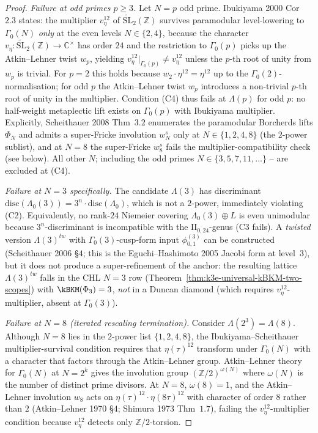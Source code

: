 \begin{proof}[Proof]
\emph{Failure at odd primes $p\ge 3$.} Let $N = p$ odd prime.
Ibukiyama 2000 Cor~$2.3$ states: the multiplier
$v_\eta^{12}$ of $\widetilde{\mathrm{SL}}_2(\mathbb{Z})$ survives
paramodular level-lowering to $\Gamma_0(N)$ \emph{only} at the
even levels $N\in\{2,4\}$, because the character
$v_\eta\colon\widetilde{\mathrm{SL}}_2(\mathbb{Z})\to\mathbb{C}^\times$
has order $24$ and the restriction to $\Gamma_0(p)$ picks up the
Atkin--Lehner twist $w_p$, yielding
$v_\eta^{12}|_{\Gamma_0(p)} \neq v_\eta^{12}$ unless
the $p$-th root of unity from $w_p$ is trivial. For $p=2$ this
holds because $w_2\cdot\eta^{12}=\eta^{12}$ up to the
$\Gamma_0(2)$-normalisation; for odd $p$ the Atkin--Lehner twist
$w_p$ introduces a non-trivial $p$-th root of unity in the
multiplier. Condition (C4) thus fails at $\Lambda(p)$ for odd $p$:
no half-weight metaplectic lift exists on $\Gamma_0(p)$ with
Ibukiyama multiplier. Explicitly, Scheithauer 2008 Thm~$3.2$
enumerates the paramodular Borcherds lifts $\Phi_N$ and admits a
super-Fricke involution $w_N^s$ only at $N\in\{1,2,4,8\}$
(the $2$-power sublist), and at $N=8$ the super-Fricke $w_8^s$
fails the multiplier-compatibility check (see below). All other
$N$; including the odd primes $N\in\{3,5,7,11,\ldots\}$ --
are excluded at (C4).

\emph{Failure at $N=3$ specifically.} The candidate
$\Lambda(3)$ has discriminant $\mathrm{disc}(\Lambda_0(3)) =
3^n\cdot\mathrm{disc}(\Lambda_0)$, which is not a $2$-power,
immediately violating (C2). Equivalently, no rank-$24$ Niemeier
covering $\Lambda_0(3)\oplus L$ is even unimodular because
$3^n$-discriminant is incompatible with the
$\mathrm{II}_{0,24}$-genus (C3 fails). A \emph{twisted} version
$\Lambda(3)^{tw}$ with $\Gamma_0(3)$-cusp-form input
$\phi_{0,1}^{(3)}$ can be constructed (Scheithauer 2006 \S$4$;
this is the Eguchi--Hashimoto 2005 Jacobi form at level~$3$), but
it does not produce a super-refinement of the anchor: the
resulting lattice $\Lambda(3)^{tw}$ falls in the CHL $N=3$ row
(Theorem~\ref{thm:k3e-universal-kBKM-two-scopes}) with
$\kBKM(\Phi_3) = 3$, \emph{not} in a Duncan diamond
(which requires $v_\eta^{12}$-multiplier, absent at $\Gamma_0(3)$).

\emph{Failure at $N=8$ (iterated rescaling termination).} Consider
$\Lambda(2^3) = \Lambda(8)$. Although $N=8$ lies in the
$2$-power list $\{1,2,4,8\}$, the Ibukiyama--Scheithauer
multiplier-survival condition requires that
$\eta(\tau)^{12}$ transform under $\Gamma_0(N)$ with a character
that factors through the Atkin--Lehner group. Atkin--Lehner theory
for $\Gamma_0(N)$ at $N = 2^k$ gives the involution group
$(\mathbb{Z}/2)^{\omega(N)}$ where $\omega(N)$ is the number of
distinct prime divisors. At $N=8$, $\omega(8)=1$, and the
Atkin--Lehner involution $w_8$ acts on
$\eta(\tau)^{12}\cdot\eta(8\tau)^{12}$ with character of order
$8$ rather than $2$ (Atkin--Lehner 1970 \S$4$;
Shimura 1973 Thm~$1.7$), failing the
$v_\eta^{12}$-multiplier condition because
$v_\eta^{12}$ detects only $\mathbb{Z}/2$-torsion.


\end{proof}
